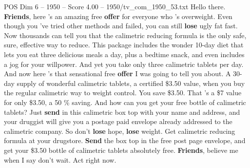 \begin{textsample}{POS Dim 6 – 1950 – Score 4.00 – 1950/tv\_com\_1950\_53.txt}  \label{ex:f6_pos_002}
Hello there. \textbf{Friends}, here 's an amazing free \textbf{offer} for everyone who 's overweight.
Even though you 've tried other methods and failed, you can still \textbf{lose} ugly fat fast.
Now thousands can tell you that the calimetric reducing formula is the only safe, sure, effective way to reduce.
This package includes the wonder 10-day diet that lets you eat three delicious meals a day, plus a bedtime snack, and even includes a jog for your willpower.
And yet you take only three calimetric tablets per day.
And now here 's that sensational free \textbf{offer} I was going to tell you about.
A 30-day supply of wonderful calimetric tablets, a certified \$3.50 value, when you buy the regular calimetric way to weight control.
You save \$3.50.
That 's a \$7 value for only \$3.50, a 50 \% saving.
And how can you get your free bottle of calimetric tablets?
Just \textbf{send} in this calimetric box top with your name and address, and your druggist will give you a postage paid envelope already addressed to the calimetric company.
So don't \textbf{lose} hope, \textbf{lose} weight.
Get calimetric reducing formula at your drugstore. \textbf{Send} the box top in the free post page envelope, and get your \$3.50 bottle of calimetric tablets absolutely free. \textbf{Friends}, believe me when I say don't wait.
Act right now.

\end{textsample}
